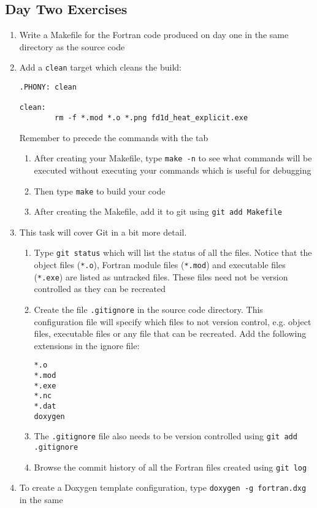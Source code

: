 \documentclass[12pt]{article}
\begin{document}
\subsection*{Day Two Exercises}
\begin{enumerate}
\item Write a Makefile for the Fortran code produced on day one in the same directory as the source
code
\item Add a \texttt{clean} target which cleans the build:
\begin{verbatim}
.PHONY: clean

clean:
        rm -f *.mod *.o *.png fd1d_heat_explicit.exe
\end{verbatim}
Remember to precede the commands with the tab
\begin{enumerate}
\item After creating your Makefile, type \texttt{make -n} to see what commands will be executed without executing
your commands which is useful for debugging
\item Then type \texttt{make} to build your code 
\item After creating the Makefile, add it to git using \texttt{git add Makefile}
\end{enumerate}
\item This task will cover Git in a bit more detail.
\begin{enumerate}
\item Type \texttt{git status} which will list the status of all the files. Notice that the object 
files (\texttt{*.o}), Fortran module files (\texttt{*.mod}) and executable files (\texttt{*.exe}) are listed as 
untracked files. These files need not be version controlled as they can be recreated
\item Create the file \texttt{.gitignore} in the source code directory. This configuration file will 
specify which files to not version control, e.g. object files, executable files or any file that can
be recreated. Add the following extensions in the ignore file:
\begin{verbatim}
*.o
*.mod
*.exe
*.nc
*.dat
doxygen
\end{verbatim}
\item The \texttt{.gitignore} file also needs to be version controlled using \texttt{git add .gitignore}
\item Browse the commit history of all the Fortran files created using \texttt{git log}
\end{enumerate}
\item To create a Doxygen template configuration, type \texttt{doxygen -g fortran.dxg} in the same

\end{enumerate}
\end{document}
